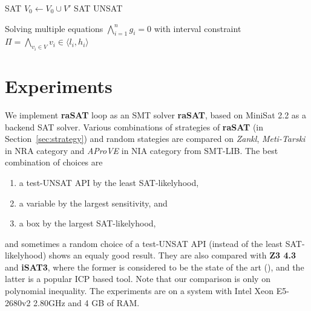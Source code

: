 \documentclass[runningheads,a4paper,oribibl]{llncs}
\begin{document}
\begin{algorithm}
\begin{algorithmic}[1]
 
	\State \Return SAT
\EndIf
{} 
		\State $V_0 \gets V_0 \cup V'$
			\State \Return SAT
		\EndIf
	\EndIf
\EndFor
\State \Return UNSAT
\EndFunction
\State {}
\end{algorithmic}
\caption{Solving multiple equations $\bigwedge\limits_{i=1}^n g_i = 0$ with interval constraint ${\Pi = \bigwedge\limits_{v_i \in V} v_i \in \langle l_i, h_i \rangle}$}
\label{Al:multiple-equations}
\end{algorithm}


\section{Experiments} \label{sec:experiment}

We implement \textbf{raSAT} loop as an SMT solver {\bf raSAT}, 
based on MiniSat 2.2 as a backend SAT solver. 
Various combinations of strategies of {\bf raSAT} (in Section~\ref{sec:strategy})
and random stategies are compared on {\em Zankl}, {\em Meti-Tarski} in NRA category 
and {\em AProVE} in NIA category from SMT-LIB. 
The best combination of choices are 
\begin{enumerate}
\item a test-UNSAT API by the least SAT-likelyhood, 
\item a variable by the largest sensitivity, and 
\item a box by the largest SAT-likelyhood, 
\end{enumerate} 
and sometimes a random choice of a test-UNSAT API (instead of the least SAT-likelyhood) 
shows an equaly good result. 
They are also compared with \textbf{Z3 4.3} and \textbf{iSAT3}, 
where the former is considered to be the state of the art (\cite{Jovanovic13}), and 
the latter is a popular ICP based tool. 
Note that our comparison is only on polynomial inequality. 
The experiments are on a system with Intel Xeon E5-2680v2 2.80GHz and 4 GB of RAM. 
\end{document}
